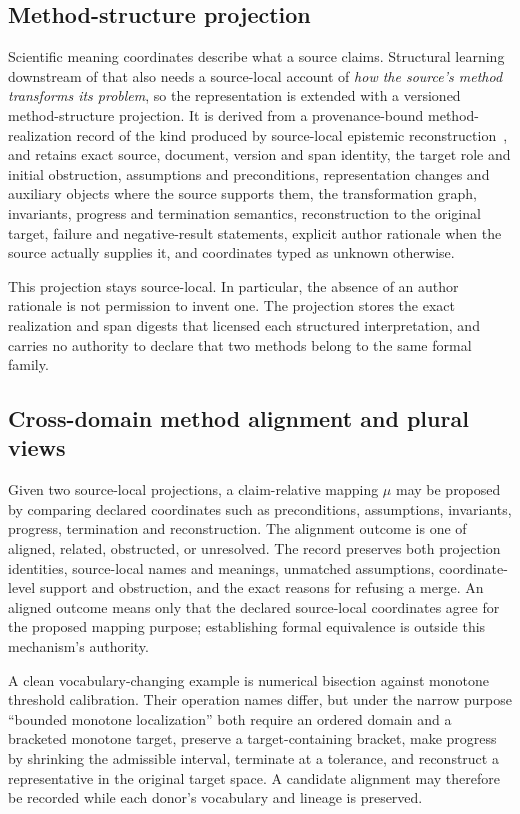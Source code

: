 \subsection{Method-structure projection}
\label{sec:method-structure-projection}

Scientific meaning coordinates describe what a source claims. Structural
learning downstream of that also needs a source-local account of \emph{how the
source's method transforms its problem}, so the representation is extended
with a versioned method-structure projection. It is derived from a
provenance-bound method-realization record of the kind produced by
source-local epistemic reconstruction~\cite{orion2025paper1}, and retains
exact source, document, version and span identity, the target role and initial
obstruction, assumptions and preconditions, representation changes and
auxiliary objects where the source supports them, the transformation graph,
invariants, progress and termination semantics, reconstruction to the original
target, failure and negative-result statements, explicit author rationale when
the source actually supplies it, and coordinates typed as unknown otherwise.

This projection stays source-local. In particular, the absence of an author
rationale is not permission to invent one. The projection stores the exact
realization and span digests that licensed each structured interpretation, and
carries no authority to declare that two methods belong to the same formal
family.

\subsection{Cross-domain method alignment and plural views}
\label{sec:method-alignment}

Given two source-local projections, a claim-relative mapping $\mu$ may be
proposed by comparing declared coordinates such as preconditions,
assumptions, invariants, progress, termination and reconstruction. The
alignment outcome is one of aligned, related, obstructed, or unresolved. The
record preserves both projection identities, source-local names and meanings,
unmatched assumptions, coordinate-level support and obstruction, and the exact
reasons for refusing a merge. An aligned outcome means only that the declared
source-local coordinates agree for the proposed mapping purpose; establishing
formal equivalence is outside this mechanism's authority.

A clean vocabulary-changing example is numerical bisection against monotone
threshold calibration. Their operation names differ, but under the narrow
purpose ``bounded monotone localization'' both require an ordered domain and a
bracketed monotone target, preserve a target-containing bracket, make progress
by shrinking the admissible interval, terminate at a tolerance, and
reconstruct a representative in the original target space. A candidate
alignment may therefore be recorded while each donor's vocabulary and lineage
is preserved.

